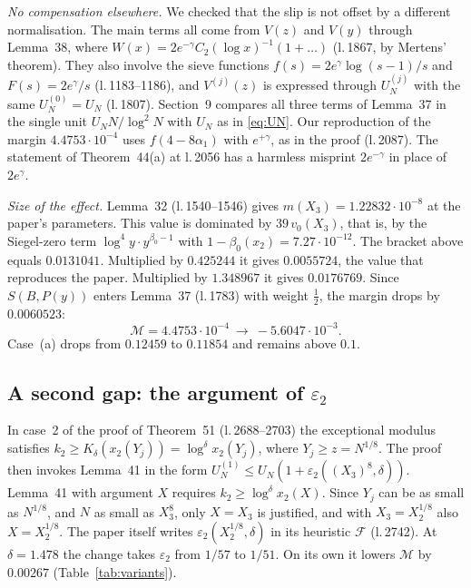 \documentclass[11pt,a4paper]{amsart}
\theoremstyle{remark}
\newcommand{\eps}{\varepsilon}
\begin{document}
\emph{No compensation elsewhere.} We checked that the slip is not offset by a different normalisation. The main
terms all come from $V(z)$ and $V(y)$ through Lemma~38, where $W(x)=2e^{-\gamma}C_2(\log x)^{-1}(1+\dots)$
(l.\,1867, by Mertens' theorem). They also involve the sieve functions $f(s)=2e^{\gamma}\log(s-1)/s$ and
$F(s)=2e^{\gamma}/s$ (l.\,1183--1186), and $V^{(j)}(z)$ is expressed through $U_N^{(j)}$ with the same $U_N^{(0)}=U_N$
(l.\,1807). Section~9 compares all three terms of Lemma~37 in the single unit $U_NN/\log^2N$ with $U_N$ as in
\eqref{eq:UN}. Our reproduction of the margin $4.4753\cdot10^{-4}$ uses $f(4-8\alpha_1)$ with $e^{+\gamma}$,
as in the proof (l.\,2087). The statement of Theorem~44(a) at l.\,2056 has a harmless misprint $2e^{-\gamma}$ in
place of $2e^{\gamma}$.

\emph{Size of the effect.} Lemma~32 (l.\,1540--1546) gives
$m(X_3)=1.22832\cdot10^{-8}$ at the paper's parameters. This value is dominated by
$39\,v_0(X_3)$, that is, by the Siegel-zero term $\log^4y\cdot y^{\beta_0-1}$ with $1-\beta_0(x_2)=7.27\cdot10^{-12}$.
The bracket above equals $0.0131041$. Multiplied by $0.425244$ it gives $0.0055724$, the value that reproduces the
paper. Multiplied by $1.348967$ it gives $0.0176769$. Since $S(B,P(y))$ enters Lemma~37 (l.\,1783) with
weight $\frac12$, the margin drops by $0.0060523$:
\[
\mathcal M=4.4753\cdot10^{-4}\ \longrightarrow\ -5.6047\cdot10^{-3}.
\]
Case~(a) drops from $0.12459$ to $0.11854$ and remains above $0.1$.

\subsection{A second gap: the argument of \texorpdfstring{$\eps_2$}{eps\_2}}\label{sec:eps2}
In case~2 of the proof of Theorem~51 (l.\,2688--2703) the exceptional modulus satisfies
$k_2\ge K_\delta(x_2(Y_j))=\log^{\delta}x_2(Y_j)$, where $Y_j\ge z=N^{1/8}$. The proof then invokes Lemma~41 in the
form $U_N^{(1)}\le U_N(1+\eps_2((X_3)^8,\delta))$. Lemma~41 with argument $X$ requires
$k_2\ge\log^{\delta}x_2(X)$. Since $Y_j$ can be as small as $N^{1/8}$, and $N$ as small as $X_3^8$, only $X=X_3$ is
justified, and with $X_3=X_2^{1/8}$ also $X=X_2^{1/8}$. The paper itself writes $\eps_2(X_2^{1/8},\delta)$ in its
heuristic $\mathcal F$ (l.\,2742). At $\delta=1.478$ the change takes $\eps_2$ from $1/57$ to $1/51$. On its own it
lowers $\mathcal M$ by $0.00267$ (Table~\ref{tab:variants}).
\end{document}
